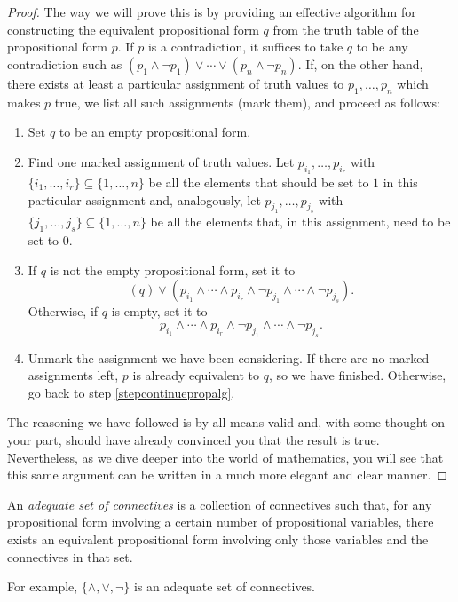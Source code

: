 \begin{proof}
The way we will prove this is by providing an effective algorithm for constructing the equivalent propositional form $q$ from the truth table of the propositional form $p$.
If $p$ is a contradiction, it suffices to take $q$ to be any contradiction such as $(p_1\land \lnot p_1) \lor \cdots \lor (p_n \land \lnot p_n)$.
If, on the other hand, there exists at least a particular assignment of truth values to $p_1,\ldots,p_n$ which makes $p$ true, we list all such assignments (mark them), and proceed as follows:
\begin{enumerate}
\item Set $q$ to be an empty propositional form.
\item \label{stepcontinuepropalg} Find one marked assignment of truth values. Let $p_{i_1},\ldots,p_{i_r}$ with $\{i_1,\ldots,i_r\}\subseteq \{1,\ldots,n\}$ be all the elements that should be set to $1$ in this particular assignment and, analogously, let $p_{j_1},\ldots,p_{j_s}$ with $\{j_1,\ldots,j_s\}\subseteq \{1,\ldots,n\}$ be all the elements that, in this assignment, need to be set to $0$.
\item If $q$ is not the empty propositional form, set it to
\[(q) \lor (p_{i_1} \land \cdots \land  p_{i_r} \land \lnot p_{j_1} \land \cdots \land \lnot p_{j_s}).\]
Otherwise, if $q$ is empty, set it to
\[p_{i_1} \land \cdots \land  p_{i_r} \land \lnot p_{j_1} \land \cdots \land \lnot p_{j_s}.\]
\item Unmark the assignment we have been considering. If there are no marked assignments left, $p$ is already equivalent to $q$, so we have finished. Otherwise, go back to step \ref{stepcontinuepropalg}.
\end{enumerate}

The reasoning we have followed is by all means valid and, with some thought on your part, should have already convinced you that the result is true. Nevertheless, as we dive deeper into the world of mathematics, you will see that this same argument can be written in a much more elegant and clear manner. 
\end{proof}

\begin{definition}
An \emph{adequate set of connectives} is a collection of connectives such that, for any propositional form involving a certain number of propositional variables, there exists an equivalent propositional form involving only those variables and the connectives in that set.

For example, $\{\land,\lor,\lnot\}$ is an adequate set of connectives.
\label{<+label+>}
\end{definition}

